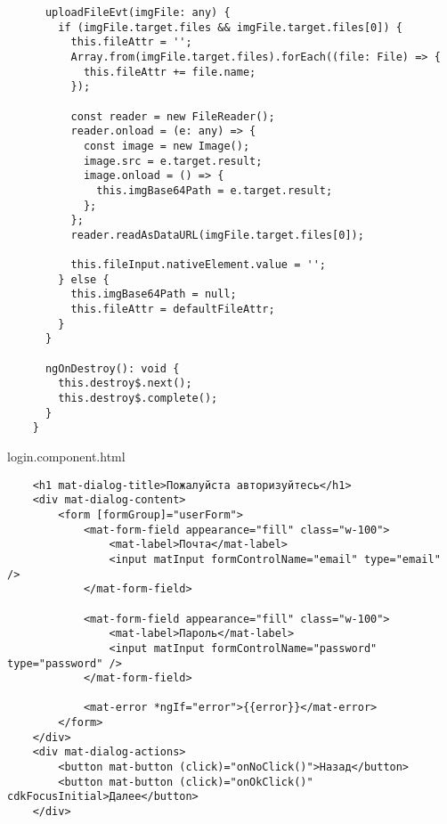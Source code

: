 \begin{lstlisting}
      uploadFileEvt(imgFile: any) {
        if (imgFile.target.files && imgFile.target.files[0]) {
          this.fileAttr = '';
          Array.from(imgFile.target.files).forEach((file: File) => {
            this.fileAttr += file.name;
          });
    
          const reader = new FileReader();
          reader.onload = (e: any) => {
            const image = new Image();
            image.src = e.target.result;
            image.onload = () => {
              this.imgBase64Path = e.target.result;
            };
          };
          reader.readAsDataURL(imgFile.target.files[0]);
    
          this.fileInput.nativeElement.value = '';
        } else {
          this.imgBase64Path = null;
          this.fileAttr = defaultFileAttr;
        }
      }
    
      ngOnDestroy(): void {
        this.destroy$.next();
        this.destroy$.complete();
      }
    }    
\end{lstlisting}

login.component.html
\begin{lstlisting}
    <h1 mat-dialog-title>Пожалуйста авторизуйтесь</h1>
    <div mat-dialog-content>
        <form [formGroup]="userForm">
            <mat-form-field appearance="fill" class="w-100">
                <mat-label>Почта</mat-label>
                <input matInput formControlName="email" type="email" />
            </mat-form-field>
    
            <mat-form-field appearance="fill" class="w-100">
                <mat-label>Пароль</mat-label>
                <input matInput formControlName="password" type="password" />
            </mat-form-field>
    
            <mat-error *ngIf="error">{{error}}</mat-error>
        </form>
    </div>
    <div mat-dialog-actions>
        <button mat-button (click)="onNoClick()">Назад</button>
        <button mat-button (click)="onOkClick()" cdkFocusInitial>Далее</button>
    </div>    
\end{lstlisting}


